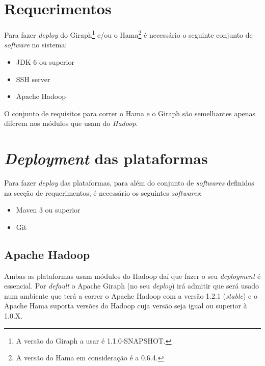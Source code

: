\documentclass[a4paper,10pt]{report}
\begin{document}
\section*{Requerimentos}\label{platformrequirements}

Para fazer \textit{deploy} do Giraph\footnote{A versão do Giraph a usar é 1.1.0-SNAPSHOT.} e/ou o Hama\footnote{A versão do Hama em consideração é a 0.6.4.} é necessário o seguinte conjunto de \textit{software} no sistema:

\begin{itemize}
 \item JDK 6 ou superior
 \item SSH server
 \item Apache Hadoop
\end{itemize}

\begin{bf}
O conjunto de requisitos para correr o Hama e o Giraph são semelhantes apenas diferem nos módulos que usam do \textit{Hadoop}.
\end{bf}

\section*{\textit{Deployment} das plataformas}

Para fazer \textit{deploy} das plataformas, para além do conjunto de \textit{softwares} definidos na secção de requerimentos, é necessário os
seguintes \textit{softwares}:
\begin{itemize}
 \item Maven 3 ou superior
 \item Git
\end{itemize}

\subsection*{Apache Hadoop}

Ambas as plataformas usam módulos do Hadoop daí que fazer o seu \textit{deployment} é essencial. Por \textit{default} o Apache Giraph (no seu \textit{deploy}) irá admitir que será usado num ambiente que terá a correr o Apache Hadoop com a versão 1.2.1 (\textit{stable}) e o Apache Hama suporta versões do Hadoop cuja versão seja igual ou superior à 1.0.X.
\end{document}
